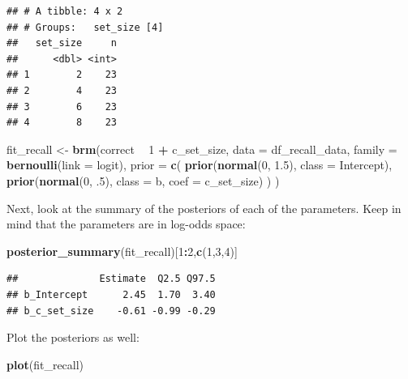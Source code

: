 \documentclass[12pt,]{krantz}
\newenvironment{Shaded}{\begin{snugshade}}{\end{snugshade}}
\newcommand{\DataTypeTok}[1]{\textcolor[rgb]{0.13,0.29,0.53}{#1}}
\newcommand{\DecValTok}[1]{\textcolor[rgb]{0.00,0.00,0.81}{#1}}
\newcommand{\FloatTok}[1]{\textcolor[rgb]{0.00,0.00,0.81}{#1}}
\newcommand{\KeywordTok}[1]{\textcolor[rgb]{0.13,0.29,0.53}{\textbf{#1}}}
\newcommand{\NormalTok}[1]{#1}
\newcommand{\OperatorTok}[1]{\textcolor[rgb]{0.81,0.36,0.00}{\textbf{#1}}}
\newcommand{\StringTok}[1]{\textcolor[rgb]{0.31,0.60,0.02}{#1}}
\theoremstyle{definition}
\theoremstyle{definition}
\theoremstyle{definition}
\theoremstyle{remark}
\begin{document}
\begin{verbatim}
## # A tibble: 4 x 2
## # Groups:   set_size [4]
##   set_size     n
##      <dbl> <int>
## 1        2    23
## 2        4    23
## 3        6    23
## 4        8    23
\end{verbatim}

\begin{Shaded}
\begin{Highlighting}[]
\NormalTok{fit_recall <-}\StringTok{ }\KeywordTok{brm}\NormalTok{(correct }\OperatorTok{~}\StringTok{ }\DecValTok{1} \OperatorTok{+}\StringTok{ }\NormalTok{c_set_size,}
  \DataTypeTok{data =}\NormalTok{ df_recall_data,}
  \DataTypeTok{family =} \KeywordTok{bernoulli}\NormalTok{(}\DataTypeTok{link =}\NormalTok{ logit),}
  \DataTypeTok{prior =} \KeywordTok{c}\NormalTok{(}
    \KeywordTok{prior}\NormalTok{(}\KeywordTok{normal}\NormalTok{(}\DecValTok{0}\NormalTok{, }\FloatTok{1.5}\NormalTok{), }\DataTypeTok{class =}\NormalTok{ Intercept),}
    \KeywordTok{prior}\NormalTok{(}\KeywordTok{normal}\NormalTok{(}\DecValTok{0}\NormalTok{, }\FloatTok{.5}\NormalTok{), }\DataTypeTok{class =}\NormalTok{ b, }\DataTypeTok{coef =}\NormalTok{ c_set_size)}
\NormalTok{  )}
\NormalTok{)}
\end{Highlighting}
\end{Shaded}

Next, look at the summary of the posteriors of each of the parameters. Keep in mind that the parameters are in log-odds space:

\begin{Shaded}
\begin{Highlighting}[]
\KeywordTok{posterior_summary}\NormalTok{(fit_recall)[}\DecValTok{1}\OperatorTok{:}\DecValTok{2}\NormalTok{,}\KeywordTok{c}\NormalTok{(}\DecValTok{1}\NormalTok{,}\DecValTok{3}\NormalTok{,}\DecValTok{4}\NormalTok{)]}
\end{Highlighting}
\end{Shaded}

\begin{verbatim}
##              Estimate  Q2.5 Q97.5
## b_Intercept      2.45  1.70  3.40
## b_c_set_size    -0.61 -0.99 -0.29
\end{verbatim}

Plot the posteriors as well:

\begin{Shaded}
\begin{Highlighting}[]
\KeywordTok{plot}\NormalTok{(fit_recall)}
\end{Highlighting}
\end{Shaded}
\end{document}
